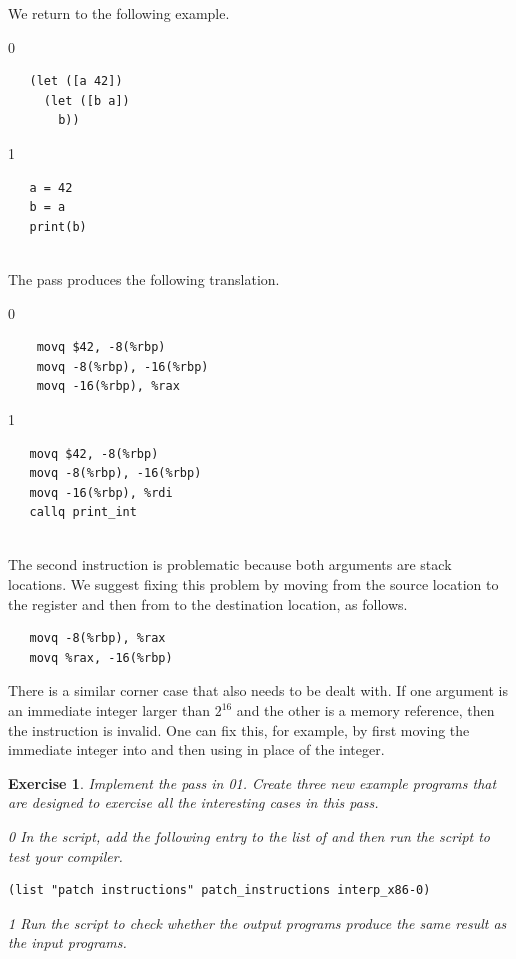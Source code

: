 \documentclass[7x10]{TimesAPriori_MIT}%
\def\racketEd{0}
\def\pythonEd{1}
\def\edition{1}
\newcommand{\racket}[1]{{\if\edition\racketEd{#1}\fi}}
\newcommand{\pythonColor}[0]{}
\newcommand{\python}[1]{{\if\edition\pythonEd\pythonColor #1\fi}}
\newtheorem{exercise}[theorem]{Exercise}
\numberwithin{theorem}{chapter}
\numberwithin{definition}{chapter}
\numberwithin{equation}{chapter}
\begin{document}
We return to the following example.\\
\begin{minipage}{0.5\textwidth}
{\if\edition\racketEd
\begin{lstlisting}
   (let ([a 42])
     (let ([b a])
       b))
\end{lstlisting}
\fi}
{\if\edition\pythonEd\pythonColor
\begin{lstlisting}
   a = 42
   b = a
   print(b)
\end{lstlisting}
\fi}
\end{minipage}\\
The  pass produces the following translation. \\
\begin{minipage}{0.5\textwidth}
{\if\edition\racketEd
\begin{lstlisting}
    movq $42, -8(%rbp)
    movq -8(%rbp), -16(%rbp)
    movq -16(%rbp), %rax
\end{lstlisting}
\fi}
{\if\edition\pythonEd\pythonColor
\begin{lstlisting}
   movq $42, -8(%rbp)
   movq -8(%rbp), -16(%rbp)
   movq -16(%rbp), %rdi
   callq print_int
\end{lstlisting}
\fi}
\end{minipage}\\
The second  instruction is problematic because both
arguments are stack locations. We suggest fixing this problem by
moving from the source location to the register  and then
from  to the destination location, as follows.
\begin{lstlisting}
   movq -8(%rbp), %rax
   movq %rax, -16(%rbp)
\end{lstlisting}

There is a similar corner case that also needs to be dealt with. If
one argument is an immediate integer larger than $2^{16}$ and the
other is a memory reference, then the instruction is invalid.  One can
fix this, for example, by first moving the immediate integer into
 and then using  in place of the integer.

\begin{exercise}
\normalfont\normalsize Implement the  pass in
\racket{}\python{}.
Create three new example programs that are
designed to exercise all the interesting cases in this pass.
%
{\if\edition\racketEd
In the  script, add the following entry to the
list of  and then run the script to test your compiler.
\begin{lstlisting}
(list "patch instructions" patch_instructions interp_x86-0)
\end{lstlisting}
\fi}
{\if\edition\pythonEd\pythonColor
Run the  script to check
whether the output programs produce the same result as the input
programs.
\fi}
\end{exercise}
\end{document}
